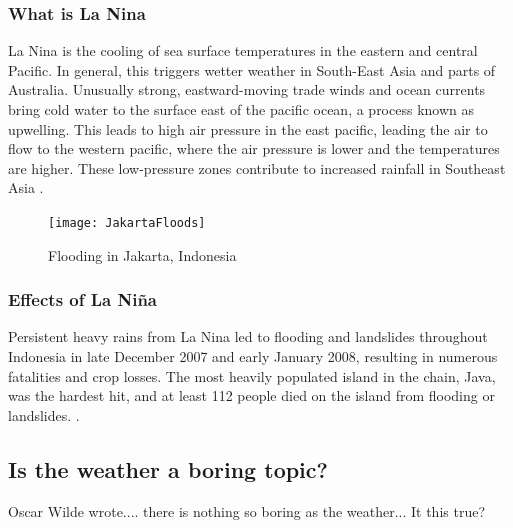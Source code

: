 \subsubsection{What is La Nina}
La Nina is the cooling of sea surface temperatures in the eastern and central Pacific. In general, this triggers wetter weather in South-East Asia and parts of Australia. Unusually strong, eastward-moving trade winds and ocean currents bring cold water to the surface east of the pacific ocean, a process known as upwelling. This leads to high air pressure in the east pacific, leading the air to flow to the western pacific, where the air pressure is lower and the temperatures are higher. These low-pressure zones contribute to increased rainfall in Southeast Asia \citep{enso}. 

\begin{figure}[h!]
  \texttt{[image: JakartaFloods]}
  \caption{Flooding in Jakarta, Indonesia}
  \label{fig:jakartafloods}
\end{figure}

\subsubsection{Effects of La Ni\~na}
Persistent heavy rains from La Nina led to flooding and landslides throughout Indonesia in late December 2007 and early January 2008, resulting in numerous fatalities and crop losses. The most heavily populated island in the chain, Java, was the hardest hit, and at least 112 people died on the island from flooding or landslides. \citep{elninoindo}.

\subsection{Is the weather a boring topic?}

Oscar Wilde wrote.... there is nothing so boring as the weather... It this true?


